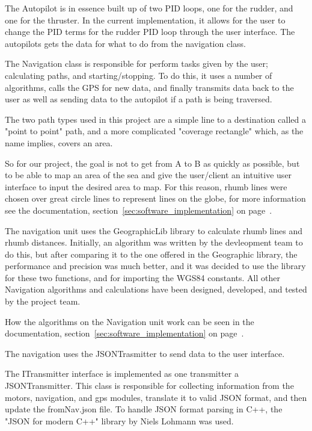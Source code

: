 The Autopilot is in essence built up of two PID loops, one for the rudder, and one for the thruster. In the current implementation, it allows for the user to change the PID terms for the rudder PID loop through the user interface. The autopilots gets the data for what to do from the navigation class.

The Navigation class is responsible for perform tasks given by the user; calculating paths, and starting/stopping. To do this, it uses a number of algorithms, calls the GPS for new data, and finally transmits data back to the user as well as sending data to the autopilot if a path is being traversed.

The two path types used in this project are a simple line to a destination called a "point to point" path, and a more complicated "coverage rectangle" which, as the name implies, covers an area.

So for our project, the goal is not to get from A to B as quickly as possible, but to be able to map an area of the sea and give the user/client an intuitive user interface to input the desired area to map. For this reason, rhumb lines were chosen over great circle lines to represent lines on the globe, for more information see the documentation, section~\ref{sec:software_implementation} on page~\pageref{sec:software_implementation}.

The navigation unit uses the GeographicLib library to calculate rhumb lines and rhumb distances. Initially, an algorithm was written by the devleopment team to do this, but after comparing it to the one offered in the Geographic library, the performance and precision was much better, and it was decided to use the library for these two functions, and for importing the WGS84 constants. All other Navigation algorithms and calculations have been designed, developed, and tested by the project team.

How the algorithms on the Navigation unit work can be seen in the documentation, section~\ref{sec:software_implementation} on page~\pageref{sec:software_implementation}.

The navigation uses the JSONTrasmitter to send data to the user interface.

The ITransmitter interface is implemented as one transmitter a JSONTransmitter. This class is responsible for collecting information from the motors, navigation, and gps modules, translate it to valid JSON format, and then update the fromNav.json file. To handle JSON format parsing in C++, the "JSON for modern C++" library by Niels Lohmann was used\cite{json}. 

